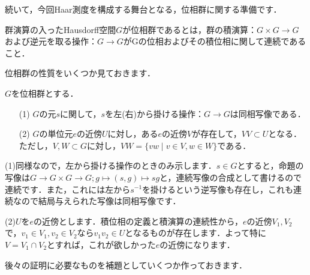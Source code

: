 続いて，今回Haar測度を構成する舞台となる，位相群に関する準備です．

\begin{ydefi}[位相群]\label{12}
群演算の入ったHausdorff空間$G$が位相群であるとは，群の積演算：$G \times G \to G$および逆元を取る操作：$G \to G$がGの位相およびその積位相に関して連続であること．
\end{ydefi}
位相群の性質をいくつか見ておきます．
\begin{yprop}[位相群の性質]\label{13}
$G$を位相群とする．
\begin{itemize}
 \item[(1)]$G$の元$s$に関して，$s$を左(右)から掛ける操作：$G \to G$は同相写像である．
 \item[(2)]$G$の単位元$e$の近傍$U$に対し，ある$e$の近傍$V$が存在して，$VV \subset U$となる．ただし，$V,W \subset G$に対し，$VW= \{ vw \mid v \in V, w \in W \}$である．
\end{itemize}
\end{yprop}
\begin{Proof}
(1)同様なので，左から掛ける操作のときのみ示します．$s \in G$とすると，命題の写像は$G \to G \times G \to G ; g \mapsto (s,g) \mapsto sg$と，連続写像の合成として書けるので連続です．また，これには左から$s^{-1}$を掛けるという逆写像も存在し，これも連続なので結局与えられた写像は同相写像です．

(2)$U$を$e$の近傍とします．積位相の定義と積演算の連続性から，$e$の近傍$V_1, V_2$で，$v_{1} \in V_1, v_{2} \in V_2$なら$v_{1}v_{2} \in U$となるものが存在します．よって特に$V=V_1 \cap V_2$とすれば，これが欲しかった$e$の近傍になります．
\end{Proof}
後々の証明に必要なものを補題としていくつか作っておきます．

